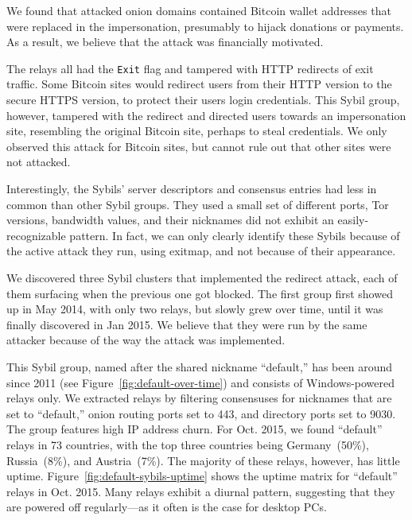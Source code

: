 We found that attacked onion domains contained Bitcoin wallet addresses that
were replaced in the impersonation, presumably to hijack donations or payments.
As a result, we believe that the attack was financially motivated.

The relays all had the \texttt{Exit} flag and tampered with HTTP redirects of
exit traffic.  Some Bitcoin sites would redirect users from their HTTP version
to the secure HTTPS version, to protect their users login credentials.  This
Sybil group, however, tampered with the redirect and directed users towards an
impersonation site, resembling the original Bitcoin site, perhaps to steal
credentials.  We only observed this attack for Bitcoin sites, but cannot rule
out that other sites were not attacked.

Interestingly, the Sybils' server descriptors and consensus entries had less in
common than other Sybil groups.  They used a small set of different ports, Tor
versions, bandwidth values, and their nicknames did not exhibit an
easily-recognizable pattern.  In fact, we can only clearly identify these Sybils
because of the active attack they run, using exitmap, and not because of their
appearance.

We discovered three Sybil clusters that implemented the redirect attack, each of
them surfacing when the previous one got blocked.  The first group first showed
up in May 2014, with only two relays, but slowly grew over time, until it was
finally discovered in Jan 2015.  We believe that they were run by the same
attacker because of the way the attack was implemented.

This Sybil group, named after the shared nickname ``default,'' has been around
since 2011 (see Figure~\ref{fig:default-over-time}) and consists of
Windows-powered relays only.  We extracted relays by filtering consensuses
for nicknames that are set to ``default,'' onion routing ports set to 443, and
directory ports set to 9030.  The group features high IP address churn.  For
Oct. 2015, we found ``default'' relays in 73 countries, with the top three
countries being Germany~(50\%), Russia~(8\%), and Austria~(7\%).  The majority
of these relays, however, has little uptime.
Figure~\ref{fig:default-sybils-uptime} shows the uptime matrix for ``default''
relays in Oct. 2015.  Many relays exhibit a diurnal pattern, suggesting
that they are powered off regularly---as it often is the case for desktop PCs.

